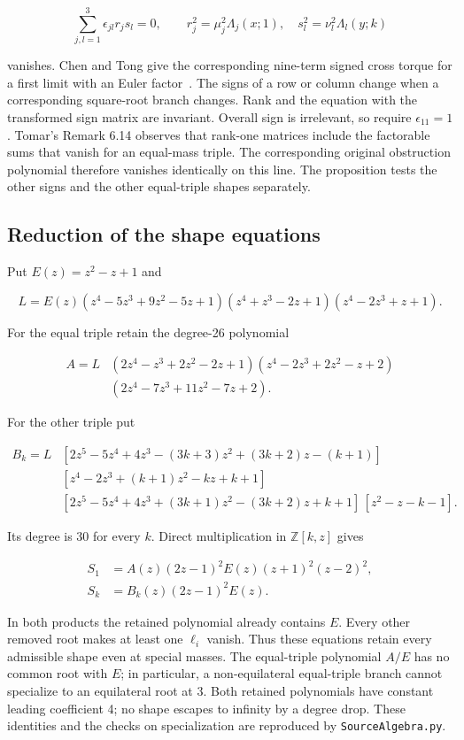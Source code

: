\documentclass[11pt]{article}
\begin{document}
\[
\sum_{j,l=1}^{3}\epsilon_{jl} r_j s_l = 0,\qquad
r_j^2=\mu_j^2\Lambda_j(x;1),\quad
s_l^2=\nu_l^2\Lambda_l(y;k)
\]

vanishes. Chen and Tong give the corresponding nine-term signed cross
torque for a first limit with an Euler factor~\cite[Sec.~5.24, Eq.~(113)]{CT}.
The signs of a row or column change when a corresponding square-root branch changes. Rank and the equation with the transformed sign matrix are invariant. Overall sign is irrelevant, so require \(\epsilon_{11}=1\). Tomar's Remark 6.14 observes that rank-one matrices include the factorable sums that vanish for an equal-mass triple. The corresponding original obstruction polynomial therefore vanishes identically on this line. The proposition tests the other signs and the other equal-triple shapes separately.

\subsection*{Reduction of the shape equations}

Put \(E(z)=z^2-z+1\) and

\[
L=E(z)(z^4-5z^3+9z^2-5z+1)(z^4+z^3-2z+1)(z^4-2z^3+z+1).
\]

For the equal triple retain the degree-26 polynomial

\[
\begin{aligned}A=L{}&(2z^4-z^3+2z^2-2z+1)(z^4-2z^3+2z^2-z+2)\\
&(2z^4-7z^3+11z^2-7z+2).\end{aligned}
\]

For the other triple put

\[
\begin{aligned}
B_k=L{}&[2z^5-5z^4+4z^3-(3k+3)z^2+(3k+2)z-(k+1)]\\
&[z^4-2z^3+(k+1)z^2-kz+k+1]\\
&[2z^5-5z^4+4z^3+(3k+1)z^2-(3k+2)z+k+1]\,
[z^2-z-k-1].
\end{aligned}
\]

Its degree is 30 for every \(k\). Direct multiplication in \(\mathbb Z[k,z]\) gives

\[
\begin{aligned}S_1&=A(z)(2z-1)^2 E(z)(z+1)^2(z-2)^2,\\
S_k&=B_k(z)(2z-1)^2 E(z).\end{aligned}
\]

In both products the retained polynomial already contains \(E\). Every other removed root makes at least one \(\ell_i\) vanish. Thus these equations retain every admissible shape even at special masses. The equal-triple polynomial \(A/E\) has no common root with \(E\); in particular, a non-equilateral equal-triple branch cannot specialize to an equilateral root at 3. Both retained polynomials have constant leading coefficient 4; no shape escapes to infinity by a degree drop. These identities and the checks on specialization are reproduced by \texttt{SourceAlgebra.py}.
\end{document}
